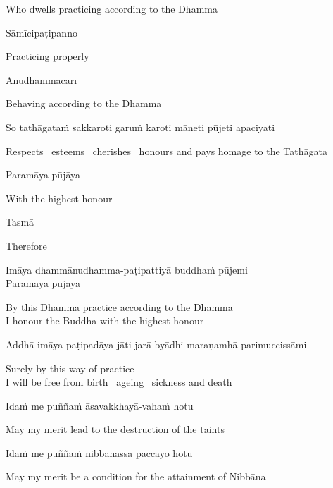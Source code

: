 \begin{english}
  Who dwells practicing according to the Dhamma
\end{english}

Sāmīcipaṭipanno

\begin{english}
  Practicing properly
\end{english}

Anudhammacārī

\begin{english}
  Behaving according to the Dhamma
\end{english}

So tathāgataṁ sakkaroti garuṁ karoti māneti pūjeti apaciyati

\begin{english-hang}
  Respects \breathmark\ esteems \breathmark\ cherishes \breathmark\ honours and pays homage to the Tathāgata
\end{english-hang}

Paramāya pūjāya

\begin{english}
  With the highest honour
\end{english}

\suttaRef{[DN 16]}

Tasmā

\begin{english}
  Therefore
\end{english}

Imāya dhammānudhamma-paṭipattiyā buddhaṁ pūjemi\\
Paramāya pūjāya

\begin{english}
  By this Dhamma practice according to the Dhamma\\
  I honour the Buddha with the highest honour
\end{english}

\begin{pali-hang}
  Addhā imāya paṭipadāya jāti-jarā-byādhi-maraṇamhā parimuccissāmi
\end{pali-hang}

\begin{english}
  Surely by this way of practice\\
  I will be free from birth \breathmark\ ageing \breathmark\ sickness and death
\end{english}

Idaṁ me puññaṁ āsavakkhayā-vahaṁ hotu

\begin{english}
  May my merit lead to the destruction of the taints
\end{english}

Idaṁ me puññaṁ nibbānassa paccayo hotu

\begin{english}
  May my merit be a condition for the attainment of Nibbāna
\end{english}



\endgroup
